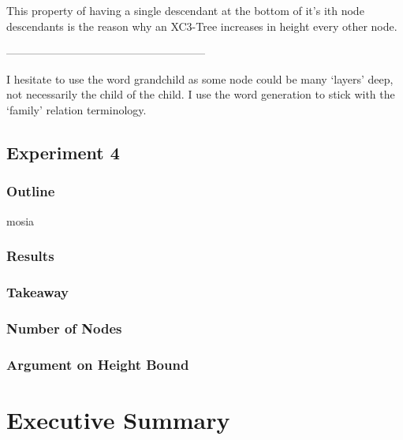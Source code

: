 \documentclass{article}
\begin{document}
This property of having a single descendant at the bottom of it's ith node descendants is the reason why an XC3-Tree increases in height every other node.

------------------------------------------------------

{
\small
I hesitate to use the word grandchild as some node could be many `layers' deep, not necessarily the child of the child. I use the word generation to stick with the `family' relation terminology.
}


\newpage
\subsection{Experiment 4}

\subsubsection{Outline}mosia

\subsubsection{Results}

\subsubsection{Takeaway}

\subsubsection{Number of Nodes}
\subsubsection{Argument on Height Bound}


\section{Executive Summary}
\end{document}
